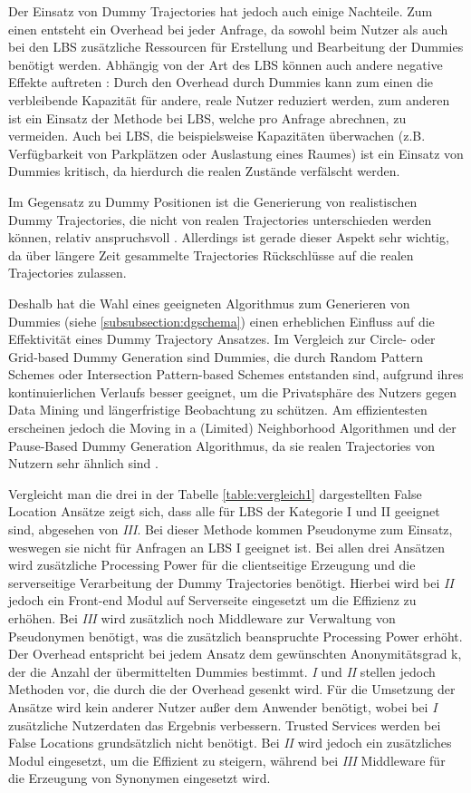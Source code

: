 Der Einsatz von Dummy Trajectories hat jedoch auch einige Nachteile. Zum einen entsteht ein Overhead bei jeder Anfrage, da sowohl beim Nutzer als auch bei den LBS zusätzliche Ressourcen für Erstellung und Bearbeitung der Dummies benötigt werden. Abhängig von der Art des LBS können auch andere negative Effekte auftreten \cite{Beresford2005}: Durch den Overhead durch Dummies kann zum einen die verbleibende Kapazität für andere, reale Nutzer reduziert werden, zum anderen ist ein Einsatz der Methode bei LBS, welche pro Anfrage abrechnen, zu vermeiden. Auch bei LBS, die beispielsweise Kapazitäten überwachen (z.B. Verfügbarkeit von Parkplätzen oder Auslastung eines Raumes) ist ein Einsatz von Dummies kritisch, da hierdurch die realen Zustände verfälscht werden.

Im Gegensatz zu Dummy Positionen ist die Generierung von realistischen Dummy Trajectories, die nicht von realen Trajectories unterschieden werden können, relativ anspruchsvoll \cite{Beresford2003}. Allerdings ist gerade dieser Aspekt sehr wichtig, da über längere Zeit gesammelte Trajectories Rückschlüsse auf die realen Trajectories zulassen. 

Deshalb hat die Wahl eines geeigneten Algorithmus zum Generieren von Dummies (siehe \ref{subsubsection:dgschema}) einen erheblichen Einfluss auf die Effektivität eines Dummy Trajectory Ansatzes. Im Vergleich zur Circle- oder Grid-based Dummy Generation sind Dummies, die durch Random Pattern Schemes oder Intersection Pattern-based Schemes entstanden sind, aufgrund ihres kontinuierlichen Verlaufs besser geeignet, um die Privatsphäre des Nutzers gegen Data Mining und längerfristige Beobachtung zu schützen. Am effizientesten erscheinen jedoch die Moving in a (Limited) Neighborhood Algorithmen und der Pause-Based Dummy Generation Algorithmus, da sie realen Trajectories von Nutzern sehr ähnlich sind \cite{Kukkapalli2012}. 

Vergleicht man die drei in der Tabelle \ref{table:vergleich1} dargestellten False Location Ansätze zeigt sich, dass alle für LBS der Kategorie I und II geeignet sind, abgesehen von \textit{III}. Bei dieser Methode kommen Pseudonyme zum Einsatz, weswegen sie nicht für Anfragen an LBS I geeignet ist. Bei allen drei Ansätzen wird zusätzliche Processing Power für die clientseitige Erzeugung und die serverseitige Verarbeitung der Dummy Trajectories benötigt. Hierbei wird bei \textit{II} jedoch ein Front-end Modul auf Serverseite eingesetzt um die Effizienz zu erhöhen. Bei \textit{III} wird zusätzlich noch Middleware zur Verwaltung von Pseudonymen benötigt, was die zusätzlich beanspruchte Processing Power erhöht. Der Overhead entspricht bei jedem Ansatz dem gewünschten Anonymitätsgrad k, der die Anzahl der übermittelten Dummies bestimmt. \textit{I} und \textit{II} stellen jedoch Methoden vor, die durch die der Overhead gesenkt wird. Für die Umsetzung der Ansätze wird kein anderer Nutzer außer dem Anwender benötigt, wobei bei \textit{I} zusätzliche Nutzerdaten das Ergebnis verbessern. Trusted Services werden bei False Locations grundsätzlich nicht benötigt. Bei \textit{II} wird jedoch ein zusätzliches Modul eingesetzt, um die Effizient zu steigern, während bei \textit{III} Middleware für die Erzeugung von Synonymen eingesetzt wird.
